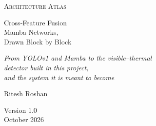 \documentclass[11pt,a4paper,oneside,openany]{book}
\begin{document}
\frontmatter
\begin{titlepage}
\thispagestyle{empty}
\centering
\vspace*{34mm}
{\large\scshape\color{muted} Architecture Atlas\par}
\vspace{20mm}
{\fontsize{29}{37}\selectfont Cross-Feature Fusion\\[2pt] Mamba Networks,\\[2pt] Drawn Block by Block\par}
\vspace{14mm}
{\Large\itshape From YOLOv1 and Mamba to the visible--thermal\\[2pt] detector built in this project,\\[2pt] and the system it is meant to become\par}
\vspace{30mm}
{\large Ritesh Roshan\par}
\vfill
{\normalsize\color{muted} Version 1.0\\[2pt] October 2026\par}
\vspace{12mm}
\end{titlepage}

\cleardoublepage
{\tableofcontents}

\mainmatter







\appendix


\backmatter

\end{document}
